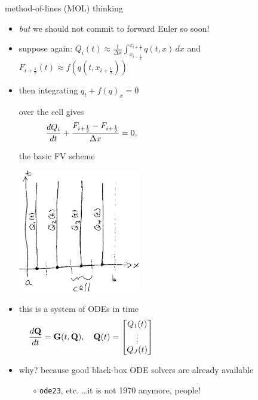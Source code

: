 \documentclass[10pt,hyperref]{beamer}
\newcommand{\bG}{\mathbf{G}}
\newcommand{\bQ}{\mathbf{Q}}
\newcommand{\xiphalf}{{x_{i+\frac{1}{2}}}}
\newcommand{\ximhalf}{{x_{i-\frac{1}{2}}}}
\newcommand{\Fiphalf}{{F_{i+\frac{1}{2}}}}
\newcommand{\ds}{\displaystyle}
\begin{document}
\begin{frame}{method-of-lines (MOL) thinking}

\begin{itemize}
\item \emph{but} we should not commit to forward Euler so soon!
\item suppose again: $\ds Q_i(t) \approx \frac{1}{\Delta x} \int_\ximhalf^\xiphalf q(t,x)\,dx$ and $\Fiphalf(t) \approx f\left(q(t,\xiphalf)\right)$
\item then integrating $q_t + f(q)_x = 0$

over the cell gives
    $$\frac{dQ_i}{dt} + \frac{\Fiphalf-\Fiphalf}{\Delta x} = 0, \hspace{60mm}$$

the basic FV scheme

\vspace{-24mm}
\hfill \includegraphics[width=0.42\textwidth]{figs/molsketch}

\vspace{-21mm}
\item this is a system of ODEs in time
    $$\frac{d\bQ}{dt} = \bG(t,\bQ), \quad \bQ(t) = \begin{bmatrix} Q_1(t) \\ \vdots \\ Q_J(t) \end{bmatrix}   \hspace{60mm}$$

\item why? because good black-box ODE solvers are already available
    \begin{itemize}
    \item[$\circ$] \texttt{ode23}, etc. \qquad \dots it is not 1970 anymore, people!
    \end{itemize}
\end{itemize}
\end{frame}
\end{document}
